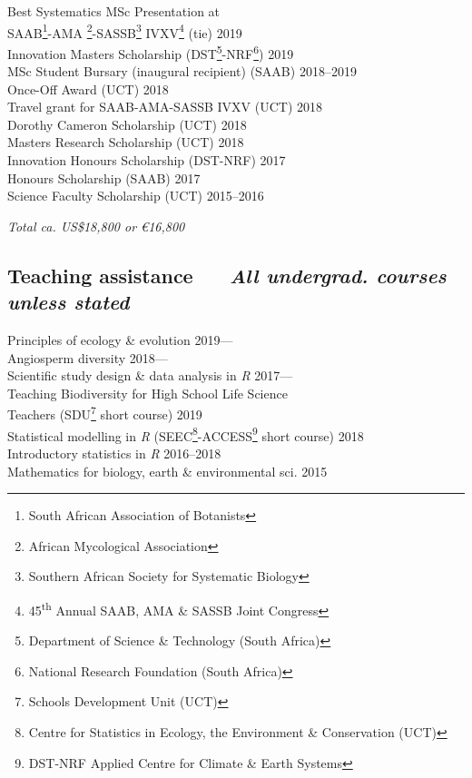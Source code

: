 \documentclass[10pt]{article}
\begin{document}
\begin{multicols}{2}
Best Systematics MSc Presentation at \\
\hspace{2em} SAAB\footnote{South African Association of Botanists}-AMA
  \footnote{African
  Mycological Association}-SASSB\footnote{Southern African Society for 
  Systematic Biology} IVXV\footnote{45\textsuperscript{th} Annual SAAB, AMA \& 
  SASSB Joint Congress} (tie)
  \hfill 2019 \\
Innovation Masters Scholarship {\footnotesize (DST\footnote{Department of 
  Science \& Technology (South Africa)}-NRF\footnote{National Research 
  Foundation (South Africa)})}
  \hfill 2019 \\
MSc Student Bursary (inaugural recipient) {\footnotesize (SAAB)}
  \hfill 2018--2019 \\
Once-Off Award {\footnotesize (UCT)}
  \hfill 2018 \\
Travel grant for SAAB-AMA-SASSB IVXV {\footnotesize (UCT)}
  \hfill 2018 \\
Dorothy Cameron Scholarship {\footnotesize (UCT)}
  \hfill 2018 \\
Masters Research Scholarship {\footnotesize (UCT)}
  \hfill 2018 \\
Innovation Honours Scholarship {\footnotesize (DST-NRF)}
  \hfill 2017 \\
Honours Scholarship {\footnotesize (SAAB)}
  \hfill 2017 \\
Science Faculty Scholarship {\footnotesize (UCT)}
  \hfill 2015--2016

\begin{center}
\textit{Total ca. US\$18,800 or €16,800}
\end{center}

\columnbreak

\subsection*{%
  Teaching assistance
  ~~{\footnotesize \textmd{\textit{
    All undergrad. courses unless stated
  }}}
}

Principles of ecology \& evolution
  \hfill 2019--- \\
Angiosperm diversity
  \hfill 2018--- \\
Scientific study design \& data analysis in \textit{R}
  \hfill 2017--- \\
Teaching Biodiversity for High School Life Science \\
  \hspace{2em} Teachers {\footnotesize
  (SDU\footnote{Schools Development Unit (UCT)} short course)}
  \hfill 2019 \\
Statistical modelling in \textit{R} {\footnotesize (SEEC\footnote{Centre for 
  Statistics in Ecology, the Environment \& Conservation (UCT)}-ACCESS\footnote{
  DST-NRF Applied Centre for Climate \& Earth Systems} short course)}
  \hfill 2018 \\
Introductory statistics in \textit{R}
  \hfill 2016--2018 \\
Mathematics for biology, earth \& environmental sci.
  \hfill 2015


\end{multicols}
\end{document}
